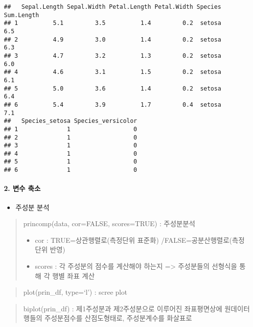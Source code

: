 \documentclass[
]{article}
\newenvironment{Shaded}{\begin{snugshade}}{\end{snugshade}}
\newcommand{\AttributeTok}[1]{\textcolor[rgb]{0.13,0.29,0.53}{#1}}
\newcommand{\CommentTok}[1]{\textcolor[rgb]{0.56,0.35,0.01}{\textit{#1}}}
\newcommand{\ConstantTok}[1]{\textcolor[rgb]{0.56,0.35,0.01}{#1}}
\newcommand{\FunctionTok}[1]{\textcolor[rgb]{0.13,0.29,0.53}{\textbf{#1}}}
\newcommand{\NormalTok}[1]{#1}
\newcommand{\OtherTok}[1]{\textcolor[rgb]{0.56,0.35,0.01}{#1}}
\newcommand{\SpecialCharTok}[1]{\textcolor[rgb]{0.81,0.36,0.00}{\textbf{#1}}}
\providecommand{\tightlist}{%
  \setlength{\itemsep}{0pt}\setlength{\parskip}{0pt}}
\begin{document}
\begin{verbatim}
##   Sepal.Length Sepal.Width Petal.Length Petal.Width Species Sum.Length
## 1          5.1         3.5          1.4         0.2  setosa        6.5
## 2          4.9         3.0          1.4         0.2  setosa        6.3
## 3          4.7         3.2          1.3         0.2  setosa        6.0
## 4          4.6         3.1          1.5         0.2  setosa        6.1
## 5          5.0         3.6          1.4         0.2  setosa        6.4
## 6          5.4         3.9          1.7         0.4  setosa        7.1
##   Species_setosa Species_versicolor
## 1              1                  0
## 2              1                  0
## 3              1                  0
## 4              1                  0
## 5              1                  0
## 6              1                  0
\end{verbatim}

\hypertarget{uxbcc0uxc218-uxcd95uxc18c}{%
\paragraph{2. 변수 축소}\label{uxbcc0uxc218-uxcd95uxc18c}}

\begin{itemize}
\tightlist
\item
  주성분 분석
\end{itemize}

\begin{quote}
princomp(data, cor=FALSE, scores=TRUE) : 주성분분석

\begin{itemize}
\item
  cor : TRUE=상관행렬로(측정단위 표준화) /FALSE=공분산행렬로(측정단위
  반영)
\item
  scores : 각 주성분의 점수를 계산해야 하는지 =\textgreater{} 주성분들의
  선형식을 통해 각 행별 좌표 계산
\end{itemize}
\end{quote}

\begin{quote}
plot(prin\_df, type=`l') : scree plot
\end{quote}

\begin{quote}
biplot(prin\_df) : 제1주성분과 제2주성분으로 이루어진 좌표평면상에
원데이터 행들의 주성분점수를 산점도형태로, 주성분계수를 화살표로
\end{quote}

\begin{Shaded}
\end{Shaded}
\end{document}
